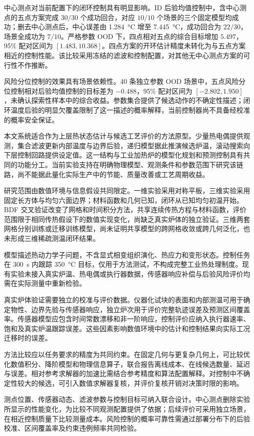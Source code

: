 中心测点对当前配置下的闭环控制具有明显影响。ID 后验均值控制中，含中心测点的五点方案完成 $30/30$ 个成功回合，对应 $10/10$ 个场景的三个固定模型均成功；删去中心测点后，中心误差由 \SI{1.284}{\degreeCelsius} 增至 \SI{7.445}{\degreeCelsius}，成功回合为 $22/30$，场景全成功为 $7/10$。严格参数 OOD 下，四点相对五点的综合目标增加 $5.497$，95\% 配对区间为 $[1.483,10.368]$。四点方案的开环估计精度未转化为与五点方案相近的控制性能。该比较采用冻结的滤波和控制配置，对其他无中心测点方案的可行性不作推断。

风险分位控制的效果具有场景依赖性。40 条独立参数 OOD 场景中，五点风险分位控制相对后验均值控制的目标差为 $-0.488$，95\% 配对区间为 $[-2.802,1.950]$，未确认探索性样本中的综合收益。参数集合提供了候选动作的不确定性描述；闭环温度后验的明显欠覆盖限制了这一描述的概率解释，当前控制器尚不具备经校准的概率安全保证。


本文系统适合作为上层热状态估计与候选工艺评价的方法原型。少量热电偶提供观测，集合滤波更新内部温度与边界后验，递归模型据此推演候选炉温，滚动搜索向下层控制回路提供设定值。这一结构与工业加热炉的模型化规划和预测控制具有共同的功能分工\cite{steinboeck2011trajectory,steinboeck2013nmpc,yi2017tracking}。当前实验支持在明确物理模型、观测条件和参数范围下研究该链路，尚不能据此量化实际生产中的节能、质量改善或工艺周期收益。

研究范围由数值环境与信息假设共同限定。一维实验采用对称平板，三维实验采用固定长方体与均匀六面边界；材料函数和几何已知，闭环从已知均匀初温开始。BDF 交叉验证改变了网格和时间积分方法，共享连续传热方程与材料函数，评价范围限于相同传热假设下的数值实现变化，尚缺乏真实炉体的独立验证。三维两套网格分别训练或迁移训练模型，尚未证明共享模型的跨网格收敛或跨几何泛化，也未形成三维稀疏测温闭环结果。

模型描述热动力学子问题，不含显式相变组织演化、热应力和变形状态。控制任务在 \SI{300}{\second} 内跟踪 \SI{350}{\degreeCelsius} 目标，仅用于方法测试，不构成完整工业热处理制度。现有实验未接入真实炉温、热电偶或执行器数据，传感器响应补偿与后验风险评价均需在实际测量中重新检验。


真实炉体验证需要独立的校准与评价数据。仪器化试块的表面和内部测温可用于确定物性、边界先验与传感器响应，独立炉次用于评价完整轨迹误差及预测区间覆盖率。传感器模型应包含时间常数漂移和非一阶响应，控制评价应纳入执行器速率、饱和及真实炉温跟踪误差。这些因素影响数值环境中的估计和控制结果向实际工况迁移时的误差。

方法比较应以任务要求的精度为共同约束。在固定几何与更复杂几何上，可比较优化数值积分、降阶模型和物理信息算子\cite{wang2021pideeponet,derouiche2021induction,gong2026heatrom}，联合报告离线成本、在线候选数量、延迟与误差。相对参考求解器的加速比需结合参考精度和算法配置解释。对控制中不确定性较大的候选，可引入数值求解器复核，并评价复核开销对决策时限的影响。

测点位置、传感器动态、滤波参数与控制目标可纳入联合设计。中心测点删除实验所显示的性能变化，为比较不同观测配置提供了依据；后续评价可采用独立场景，在相近控制质量下比较测量成本。风险控制的概率可靠性需通过部署分布下的后验校准、区间覆盖率及约束违例频率共同检验。
